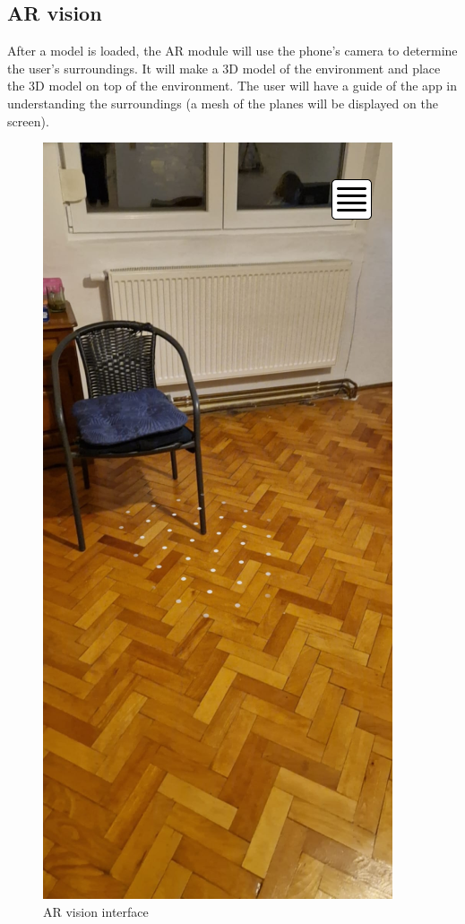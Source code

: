 \subsection{AR vision}
After a model is loaded, the AR module will use the phone's camera to determine the user's surroundings. It will make a 3D model of the environment and place the 3D model on top of the environment. The user will have a guide of the app in understanding the surroundings (a mesh of the planes will be displayed on the screen).
\begin{figure}[h!]
    \begin{center}
        \includegraphics[scale=0.5]{img/App_mock/iPhone 14 - 5.png}
        \caption{AR vision interface}
        \label{fig:ar-vision}
    \end{center}
\end{figure}

